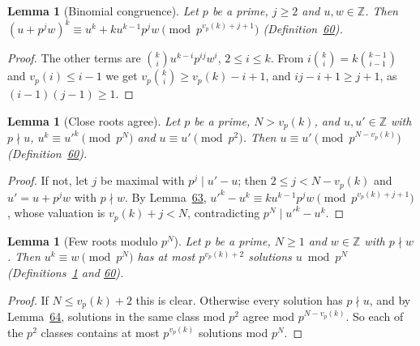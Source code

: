 \documentclass[11pt]{article}
\newcounter{hffc}
\theoremstyle{definition}\newtheorem{hffdef}[hffc]{Definition}
\theoremstyle{plain}\newtheorem{hfflem}[hffc]{Lemma}\newtheorem{hffthm}[hffc]{Theorem}
\theoremstyle{remark}\newtheorem{hffrem}[hffc]{Remark}
\newcommand{\hffcost}{}
\newcommand{\setcost}[1]{\renewcommand{\hffcost}{#1}}
\newcommand{\Z}{\mathbb{Z}}\newcommand{\R}{\mathbb{R}}\newcommand{\N}{\mathbb{N}}
\begin{document}
\begin{hfflem}[Binomial congruence]\label{L:binom}
Let $p$ be a prime, $j\ge2$ and $u,w\in\Z$. Then $(u+p^jw)^k\equiv u^k+ku^{k-1}p^jw\pmod{p^{v_p(k)+j+1}}$ (Definition~\hyperref[D:gpart]{60}).
\par\nopagebreak{}
\end{hfflem}
\begin{proof}\setcost{length 110/300}The other terms are $\binom kiu^{k-i}p^{ij}w^i$, $2\le i\le k$. From $i\binom ki=k\binom{k-1}{i-1}$ and $v_p(i)\le i-1$ we get $v_p\binom ki\ge v_p(k)-i+1$, and $ij-i+1\ge j+1$, as $(i-1)(j-1)\ge1$.
\end{proof}

\begin{hfflem}[Close roots agree]\label{L:close}
Let $p$ be a prime, $N>v_p(k)$, and $u,u'\in\Z$ with $p\nmid u$, $u^k\equiv u'^k\pmod{p^N}$ and $u\equiv u'\pmod{p^2}$. Then $u\equiv u'\pmod{p^{N-v_p(k)}}$ (Definition~\hyperref[D:gpart]{60}).
\par\nopagebreak{}
\end{hfflem}
\begin{proof}\setcost{length 155/300}If not, let $j$ be maximal with $p^j\mid u'-u$; then $2\le j<N-v_p(k)$ and $u'=u+p^jw$ with $p\nmid w$. By Lemma~\hyperref[L:binom]{63}, $u'^k-u^k\equiv ku^{k-1}p^jw\pmod{p^{v_p(k)+j+1}}$, whose valuation is $v_p(k)+j<N$, contradicting $p^N\mid u'^k-u^k$.
\end{proof}

\begin{hfflem}[Few roots modulo $p^N$]\label{L:rootsp}
Let $p$ be a prime, $N\ge1$ and $w\in\Z$ with $p\nmid w$. Then $u^k\equiv w\pmod{p^N}$ has at most $p^{v_p(k)+2}$ solutions $u\bmod p^N$ (Definitions~\hyperref[D:conv]{1} and \hyperref[D:gpart]{60}).
\par\nopagebreak{}
\end{hfflem}
\begin{proof}\setcost{length 165/300}If $N\le v_p(k)+2$ this is clear. Otherwise every solution has $p\nmid u$, and by Lemma~\hyperref[L:close]{64}, solutions in the same class mod $p^2$ agree mod $p^{N-v_p(k)}$. So each of the $p^2$ classes contains at most $p^{v_p(k)}$ solutions mod $p^N$.
\end{proof}
\end{document}

